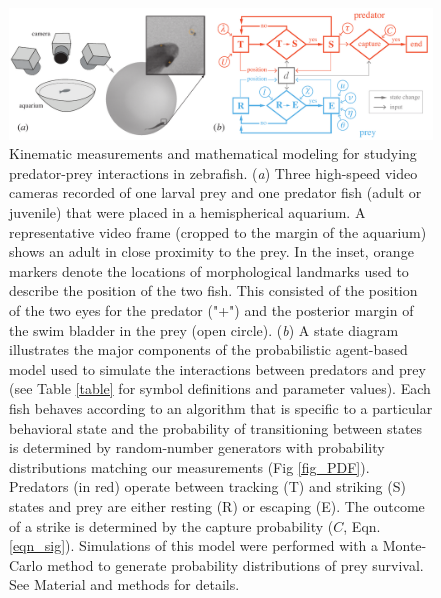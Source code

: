 \documentclass[]{rsos}%
\begin{document}
\pagebreak

\linespread{1}\selectfont %


\begin{figure}[!h]
\centering
	\includegraphics[width=5.5in]{fig_setup}
\caption{
Kinematic measurements and mathematical modeling for studying predator-prey interactions in zebrafish. 
(\textit{a}) Three high-speed video cameras recorded of one larval prey and one predator fish (adult or juvenile) that were placed in a hemispherical aquarium. 
A representative video frame (cropped to the margin of the aquarium) shows an adult in close proximity to the prey. 
In the inset, orange markers denote the locations of morphological landmarks used to describe the position of the two fish.
This consisted of the position of the two eyes for the predator ("+") and the posterior margin of the swim bladder in the prey (open circle). 
 (\textit{b}) A state diagram illustrates the major components of the probabilistic agent-based model used to simulate the interactions between predators and prey (see Table \ref{table} for symbol definitions and parameter values). 
Each fish behaves according to an algorithm that is specific to a particular behavioral state and the probability of transitioning between states is determined by random-number generators with probability distributions matching our measurements (Fig \ref{fig_PDF}).
Predators (in red) operate between tracking (T) and striking (S) states and prey are either resting (R) or escaping (E).
The outcome of a strike is determined by the capture probability ($C$, Eqn. \ref{eqn_sig}). 
Simulations of this model were performed with a Monte-Carlo method to generate probability distributions of prey survival.
See Material and methods for details.
 }
\label{fig_setup}
\end{figure}

\pagebreak
\end{document}
